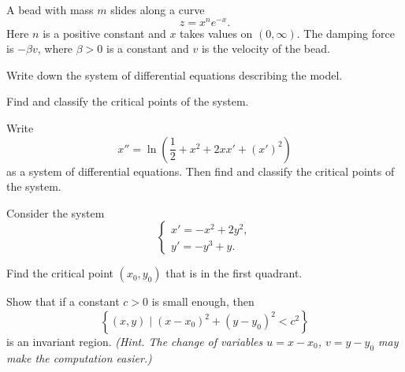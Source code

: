 \begin{problem}
A bead with mass $m$ slides along a curve
\[
z=x^n e^{-x}.
\]
Here $n$ is a positive constant and $x$ takes values on $(0,\infty)$. The damping force is $-\beta v$, where $\beta>0$ is a constant and $v$ is the velocity of the bead.
\begin{problemsubparts}
\item Write down the system of differential equations describing the model.
\item Find and classify the critical points of the system.
\end{problemsubparts}
\end{problem}

\begin{problem}
Write
\[
x''=\ln\left(\frac12+x^2+2xx'+(x')^2\right)
\]
as a system of differential equations. Then find and classify the critical points of the system.
\end{problem}

\begin{problem}
Consider the system
\[
\begin{cases}
x'=-x^2+2y^2,\\
y'=-y^3+y.
\end{cases}
\]
\begin{problemsubparts}
\item Find the critical point $(x_0,y_0)$ that is in the first quadrant.
\item Show that if a constant $c>0$ is small enough, then
\[
\left\{(x,y)\mid (x-x_0)^2+(y-y_0)^2<c^2\right\}
\]
is an invariant region. \textit{(Hint. The change of variables $u=x-x_0$, $v=y-y_0$ may make the computation easier.)}
\end{problemsubparts}
\end{problem}

